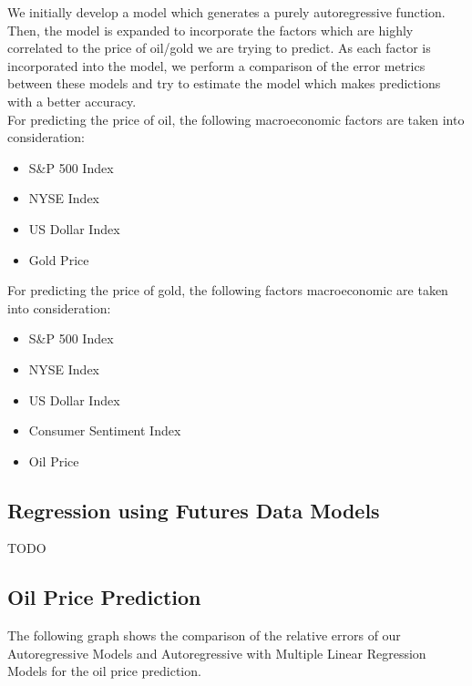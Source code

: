 \documentclass[runningheads]{llncs}
\begin{document}
\noindent We initially develop a model which generates a purely autoregressive function. Then, the model is expanded to incorporate the factors which are highly correlated to the price of oil/gold we are trying to predict. As each factor is incorporated into the model, we perform a comparison of the error metrics between these models and try to estimate the model which makes predictions with a better accuracy.\\

\noindent For predicting the price of oil, the following macroeconomic factors are taken into consideration:
\begin {itemize}
\item S\&P 500 Index
\item NYSE Index
\item US Dollar Index
\item Gold Price
\end {itemize}

\noindent For predicting the price of gold, the following factors macroeconomic are taken into consideration:
\begin {itemize}
\item S\&P 500 Index
\item NYSE Index
\item US Dollar Index
\item Consumer Sentiment Index
\item Oil Price
\end {itemize}

\subsection{Regression using Futures Data Models}
TODO

\subsection{Oil Price Prediction}
The following graph shows the comparison of the relative errors of our Autoregressive Models and Autoregressive with Multiple Linear Regression Models for the oil price prediction.
\end{document}

